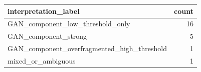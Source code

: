 \begin{tabular}{lr}
\toprule
interpretation_label & count \\
\midrule
GAN_component_low_threshold_only & 16 \\
GAN_component_strong & 5 \\
GAN_component_overfragmented_high_threshold & 1 \\
mixed_or_ambiguous & 1 \\
\bottomrule
\end{tabular}
